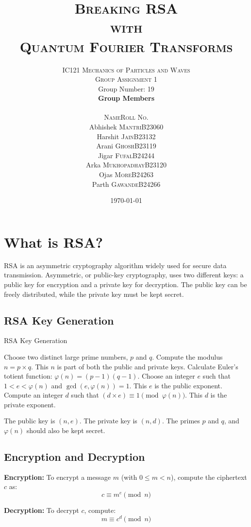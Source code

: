 \documentclass{article}
\title{\Huge\textsc{Breaking RSA \\ with \\ Quantum Fourier Transforms}}
\author{
    \Large\textsc{\vspace{2cm} IC121 Mechanics of Particles and Waves}\\[2ex]
        \LARGE\textsc{Group Assignment 1}\vspace{0.5cm}\\
        \Large{Group Number: 19}\\[2cm]
        \textbf{\Large Group Members}\vspace{0.5cm}\\[1ex]
        \begin{tabular}{r|l} 
            \hline \hline
            \textsc{Name} & \textsc{Roll No.} \\ \hline 
            Abhishek \textsc{Mantri}        & B23060 \\ 
            Harshit \textsc{Jain}           & B23132 \\
            Arani \textsc{Ghosh}            & B23119 \\
            Jigar \textsc{Fufal}            & B24244 \\
            Arka \textsc{Mukhopadhay}       & B23120 \\
            Ojas \textsc{More}              & B24263 \\
            Parth \textsc{Gawande}          & B24266 \\ 
            \hline \hline
        \end{tabular}
        \vspace{5cm}
}
\date{\today}
\begin{document}
\maketitle
\newpage
\tableofcontents
\newpage

\section{What is RSA?}

\begin{infobox}[title=RSA Overview]
    RSA is an asymmetric cryptography algorithm widely used for secure data transmission. Asymmetric, or public-key cryptography, uses two different keys: a public key for encryption and a private key for decryption. The public key can be freely distributed, while the private key must be kept secret.
\end{infobox}

\subsection{RSA Key Generation}

\begin{algorithm}
    \caption{RSA Key Generation}
    \begin{algorithmic}[1]
        \State Choose two distinct large prime numbers, $p$ and $q$.
        \State Compute the modulus $n = p \times q$. This $n$ is part of both the public and private keys.
        \State Calculate Euler's totient function: $\varphi(n) = (p - 1)(q - 1)$.
        \State Choose an integer $e$ such that $1 < e < \varphi(n)$ and $\gcd(e, \varphi(n)) = 1$. This $e$ is the public exponent.
        \State Compute an integer $d$ such that $(d \times e) \equiv 1 \pmod{\varphi(n)}$. This $d$ is the private exponent.
    \end{algorithmic}
\end{algorithm}

The public key is $(n, e)$. The private key is $(n, d)$. The primes $p$ and $q$, and $\varphi(n)$ should also be kept secret.

\subsection{Encryption and Decryption}

\textbf{Encryption:} To encrypt a message $m$ (with $0 \leq m < n$), compute the ciphertext $c$ as:
\[
    c \equiv m^e \pmod{n}
\]

\textbf{Decryption:} To decrypt $c$, compute:
\[
    m \equiv c^d \pmod{n}
\]
\end{document}
